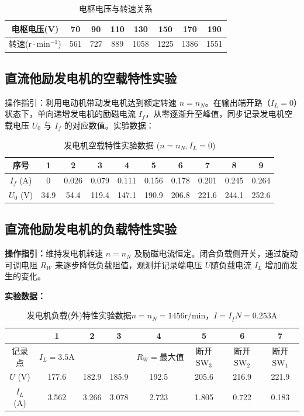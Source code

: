 \begin{framed}
{			\begin{table}[H]
				\centering
				\caption{\hspace{0.5em}电枢电压与转速关系}
				\begin{tabular}{cccccccc}
					\toprule
					电枢电压(V) & 70 & 90 & 110 & 130 & 150 & 170 & 190 \\
					\midrule
					转速($\mathrm{r} \cdot \mathrm{min}^{-1}$) & 561 & 727 & 889 & 1058 & 1225 & 1386 &1551 \\
					\bottomrule
				\end{tabular}
			\end{table}
			
			\subsection{直流他励发电机的空载特性实验}
			操作指引：利用电动机带动发电机达到额定转速 $n=n_N$。在输出端开路（$I_L=0$）状态下，单向递增发电机的励磁电流 $I_f$，从零逐渐升至峰值，同步记录发电机空载电压 $U_0$ 与 $I_f$ 的对应数值。实验数据：
			\begin{table}[H]
				\centering
				\caption{\hspace{0.5em}发电机空载特性实验数据 ($n=n_N, I_L=0$)}
				\begin{tabular}{cccccccccc}
					\toprule
					序号 & 1 & 2 & 3 & 4 & 5 & 6 & 7 & 8 & 9\\
					\midrule
					$I_f$ (A) & 0 & 0.026 & 0.079 & 0.111 & 0.156 & 0.178 & 0.201 & 0.245 & 0.264\\
					$U_0$ (V) & 34.9 & 54.4 & 119.4 & 147.1 & 190.9 & 206.8 & 221.6 & 244.1 & 252.6\\
					\bottomrule
				\end{tabular}
			\end{table}
			
			\subsection{直流他励发电机的负载特性实验}
			\textbf{操作指引：}维持发电机转速 $n=n_N$ 及励磁电流恒定。闭合负载侧开关，通过旋动可调电阻 $R_W$ 来逐步降低负载阻值，观测并记录端电压 $U$随负载电流 $I_L$ 增加而发生的变化。
			
			\textbf{实验数据：}
			\begin{table}[H]
				\centering
				\caption{\hspace{0.5em}发电机负载(外)特性实验数据$n=n_N=1456\text{r/min}$，$I=I_fN=0.253\text{A}$}
				\begin{tabular}{cccccccc}
					\toprule
					& 1 & 2 & 3 & 4 & 5 & 6 & 7 \\
					\midrule
					记录点 & $I_L=3.5\text{A}$ & & & $R_W=\text{最大值}$ & 断开$\text{SW}_3$ & 断开$\text{SW}_2$ & 断开$\text{SW}_1$ \\
					$U$ (V) & 177.6 & 182.9 & 185.9 & 192.5 & 205.6 & 216.9 & 221.9 \\
					$I_L$ (A) & 3.562 & 3.266 & 3.078 & 2.723 & 1.805 & 0.722 & 0.183 \\
					\bottomrule
				\end{tabular}
			\end{table}
			
}
\end{framed}
